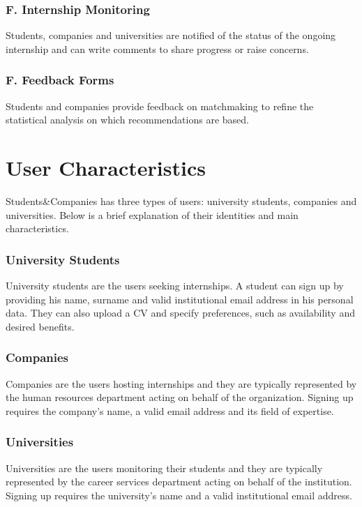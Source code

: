 \subsubsection*{F\fc. Internship Monitoring}
Students, companies and universities are notified of the status of the ongoing internship and can write comments to share progress or raise concerns.

\subsubsection*{F\fc. Feedback Forms}
Students and companies provide feedback on matchmaking to refine the statistical analysis on which recommendations are based.

\section{User Characteristics}
Students\&Companies has three types of users: university students, companies and universities.
Below is a brief explanation of their identities and main characteristics.

\subsubsection{University Students}
University students are the users seeking internships.
A student can sign up by providing his name, surname and valid institutional email address in his personal data.
They can also upload a CV and specify preferences, such as availability and desired benefits.

\subsubsection{Companies}
Companies are the users hosting internships and they are typically represented by the human resources department acting on behalf of the organization.
Signing up requires the company's name, a valid email address and its field of expertise.

\subsubsection{Universities}
Universities are the users monitoring their students and they are typically represented by the career services department acting on behalf of the institution.
Signing up requires the university's name and a valid institutional email address.

